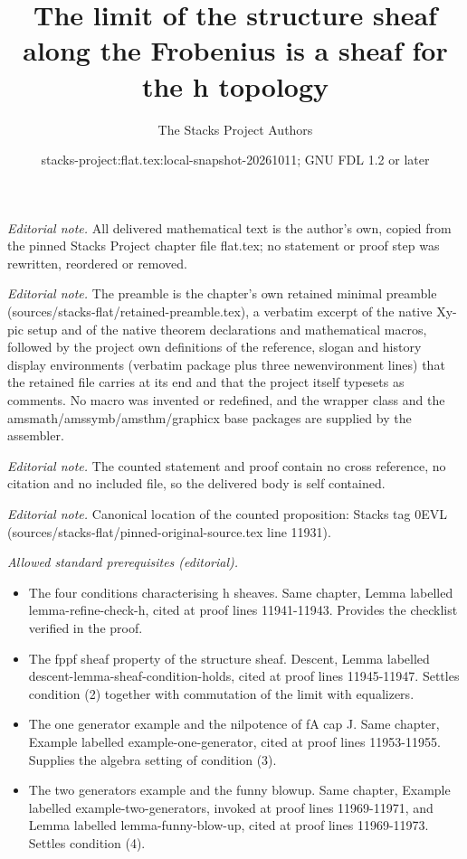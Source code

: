 \documentclass[10pt,a4paper]{amsart}
\title{The limit of the structure sheaf along the Frobenius is a sheaf for the h topology}
\author{The Stacks Project Authors}
\date{stacks-project:flat.tex:local-snapshot-20261011; GNU FDL 1.2 or later}
\theoremstyle{plain}
\theoremstyle{definition}
\theoremstyle{remark}
\numberwithin{equation}{subsection}
\begin{document}
\maketitle
\noindent\textit{Editorial note.} All delivered mathematical text is the author's own, copied from the pinned Stacks Project chapter file flat.tex; no statement or proof step was rewritten, reordered or removed.\par\medskip
\noindent\textit{Editorial note.} The preamble is the chapter's own retained minimal preamble (sources/stacks-flat/retained-preamble.tex), a verbatim excerpt of the native Xy-pic setup and of the native theorem declarations and mathematical macros, followed by the project own definitions of the reference, slogan and history display environments (verbatim package plus three newenvironment lines) that the retained file carries at its end and that the project itself typesets as comments. No macro was invented or redefined, and the wrapper class and the amsmath/amssymb/amsthm/graphicx base packages are supplied by the assembler.\par\medskip
\noindent\textit{Editorial note.} The counted statement and proof contain no cross reference, no citation and no included file, so the delivered body is self contained.\par\medskip
\noindent\textit{Editorial note.} Canonical location of the counted proposition: Stacks tag 0EVL (sources/stacks-flat/pinned-original-source.tex line 11931).\par\medskip
\noindent\textit{Allowed standard prerequisites (editorial).}\begin{itemize}
\item The four conditions characterising h sheaves. Same chapter, Lemma labelled lemma-refine-check-h, cited at proof lines 11941-11943. Provides the checklist verified in the proof.
\item The fppf sheaf property of the structure sheaf. Descent, Lemma labelled descent-lemma-sheaf-condition-holds, cited at proof lines 11945-11947. Settles condition (2) together with commutation of the limit with equalizers.
\item The one generator example and the nilpotence of fA cap J. Same chapter, Example labelled example-one-generator, cited at proof lines 11953-11955. Supplies the algebra setting of condition (3).
\item The two generators example and the funny blowup. Same chapter, Example labelled example-two-generators, invoked at proof lines 11969-11971, and Lemma labelled lemma-funny-blow-up, cited at proof lines 11969-11973. Settles condition (4).
\end{itemize}\medskip
\end{document}
